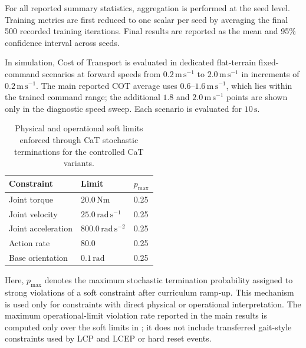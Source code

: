 \documentclass{article}
\newcommand{\baselineOne}{LCP}
\newcommand{\baselineThree}{LCEP}
\begin{document}
    For all reported summary statistics, aggregation is performed at the seed level. Training metrics are first reduced to one scalar per seed by averaging the final 500 recorded training iterations. Final results are reported as the mean and 95\% confidence interval across seeds.
    
    In simulation, Cost of Transport is evaluated in dedicated flat-terrain fixed-command scenarios at forward speeds from \(0.2\,\mathrm{m\,s^{-1}}\) to \(2.0\,\mathrm{m\,s^{-1}}\) in increments of \(0.2\,\mathrm{m\,s^{-1}}\). The main reported COT average uses \(0.6\)--\(1.6\,\mathrm{m\,s^{-1}}\), which lies within the trained command range; the additional \(1.8\) and \(2.0\,\mathrm{m\,s^{-1}}\) points are shown only in the diagnostic speed sweep. Each scenario is evaluated for \(10\,\mathrm{s}\).
    
    \begin{table}[htbp]
        \centering
        \small
        \caption{Physical and operational soft limits enforced through CaT stochastic terminations for the controlled CaT variants.}
        \label{tab:appendix-soft-constraints}
        \begin{tabular}{lll}
            \toprule
            \textbf{Constraint} & \textbf{Limit} & \(p_{\max}\) \\
            \midrule
            Joint torque & \(20.0\,\mathrm{Nm}\) & 0.25 \\
            Joint velocity & \(25.0\,\mathrm{rad\,s^{-1}}\) & 0.25 \\
            Joint acceleration & \(800.0\,\mathrm{rad\,s^{-2}}\) & 0.25 \\
            Action rate & 80.0 & 0.25 \\
            Base orientation & \(0.1 \,\mathrm{rad}\) & 0.25 \\
            \bottomrule
        \end{tabular}
    \end{table}
    
    Here, \(p_{\max}\) denotes the maximum stochastic termination probability assigned to strong violations of a soft constraint after curriculum ramp-up. This mechanism is used only for constraints with direct physical or operational interpretation. The maximum operational-limit violation rate reported in the main results is computed only over the soft limits in ; it does not include transferred gait-style constraints used by \baselineOne{} and \baselineThree{} or hard reset events.
\end{document}
